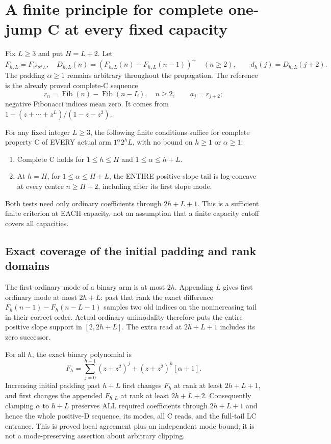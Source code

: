 \section{A finite principle for complete one-jump C at every fixed capacity}
Fix $L\ge3$ and put $H=L+2$.  Let
\[
 F_{h,L}=F_{1^\alpha2^hL},\quad
 D_{h,L}(n)=(F_{h,L}(n)-F_{h,L}(n-1))^+\quad(n\ge2),
 \qquad d_h(j)=D_{h,L}(j+2).
\]
The padding $\alpha\ge1$ remains arbitrary throughout the propagation.
The reference is the already proved complete-C sequence
\[
 r_n=\operatorname{Fib}(n)-\operatorname{Fib}(n-L),\quad n\ge2,
 \qquad a_j=r_{j+2};                                    \tag{1}
\]
negative Fibonacci indices mean zero.  It comes from
$1+(z+\cdots+z^L)/(1-z-z^2)$.

\begin{theorem}
For any fixed integer $L\ge3$, the following finite conditions suffice
for complete property C of EVERY actual arm $1^\alpha2^hL$,
with no bound on $h\ge1$ or $\alpha\ge1$:
\begin{enumerate}
\item Complete C holds for $1\le h\le H$ and
      $1\le\alpha\le h+L$.
\item At $h=H$, for $1\le\alpha\le H+L$, the ENTIRE
      positive-slope tail is log-concave at every centre
      $n\ge H+2$, including after its first slope mode.
\end{enumerate}
Both tests need only ordinary coefficients through $2h+L+1$.
This is a sufficient finite criterion at EACH capacity, not an
assumption that a finite capacity cutoff covers all capacities.
\end{theorem}

\subsection*{Exact coverage of the initial padding and rank domains}
The first ordinary mode of a binary arm is at most $2h$.
Appending $L$ gives first ordinary mode at most $2h+L$:
past that rank the exact difference
$F_h(n-1)-F_h(n-L-1)$ samples two old indices on the
nonincreasing tail in their correct order.  Actual ordinary
unimodality therefore puts the entire positive slope support in
$[2,2h+L]$.  The extra read at $2h+L+1$ includes its zero successor.

For all $h$, the exact binary polynomial is
\[
 F_h=\sum_{j=0}^{h-1}(z+z^2)^j+(z+z^2)^h[\alpha+1].     \tag{2}
\]
Increasing initial padding past $h+L$ first changes $F_h$ at
rank at least $2h+L+1$, and first changes the appended
$F_{h,L}$ at rank at least $2h+L+2$.
Consequently clamping $\alpha$ to $h+L$ preserves ALL required
coefficients through $2h+L+1$ and hence the whole positive-D sequence,
its modes, all C reads, and the full-tail LC entrance.
This is proved local agreement plus an independent mode bound;
it is not a mode-preserving assertion about arbitrary clipping.

